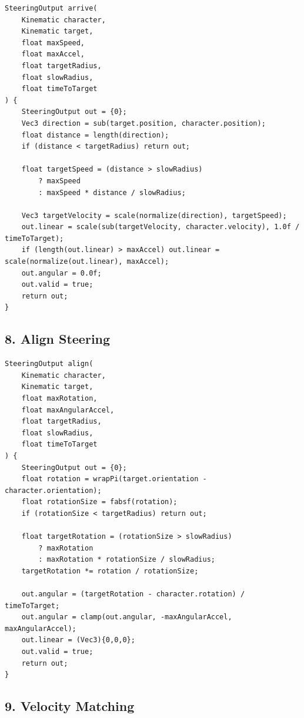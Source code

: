 \documentclass[10pt,letterpaper]{article}
\begin{document}
\begin{verbatim}
SteeringOutput arrive(
    Kinematic character,
    Kinematic target,
    float maxSpeed,
    float maxAccel,
    float targetRadius,
    float slowRadius,
    float timeToTarget
) {
    SteeringOutput out = {0};
    Vec3 direction = sub(target.position, character.position);
    float distance = length(direction);
    if (distance < targetRadius) return out;

    float targetSpeed = (distance > slowRadius)
        ? maxSpeed
        : maxSpeed * distance / slowRadius;

    Vec3 targetVelocity = scale(normalize(direction), targetSpeed);
    out.linear = scale(sub(targetVelocity, character.velocity), 1.0f / timeToTarget);
    if (length(out.linear) > maxAccel) out.linear = scale(normalize(out.linear), maxAccel);
    out.angular = 0.0f;
    out.valid = true;
    return out;
}
\end{verbatim}

\subsection*{8. Align Steering}
{}

\begin{verbatim}
SteeringOutput align(
    Kinematic character,
    Kinematic target,
    float maxRotation,
    float maxAngularAccel,
    float targetRadius,
    float slowRadius,
    float timeToTarget
) {
    SteeringOutput out = {0};
    float rotation = wrapPi(target.orientation - character.orientation);
    float rotationSize = fabsf(rotation);
    if (rotationSize < targetRadius) return out;

    float targetRotation = (rotationSize > slowRadius)
        ? maxRotation
        : maxRotation * rotationSize / slowRadius;
    targetRotation *= rotation / rotationSize;

    out.angular = (targetRotation - character.rotation) / timeToTarget;
    out.angular = clamp(out.angular, -maxAngularAccel, maxAngularAccel);
    out.linear = (Vec3){0,0,0};
    out.valid = true;
    return out;
}
\end{verbatim}

\subsection*{9. Velocity Matching}
{}
\end{document}
